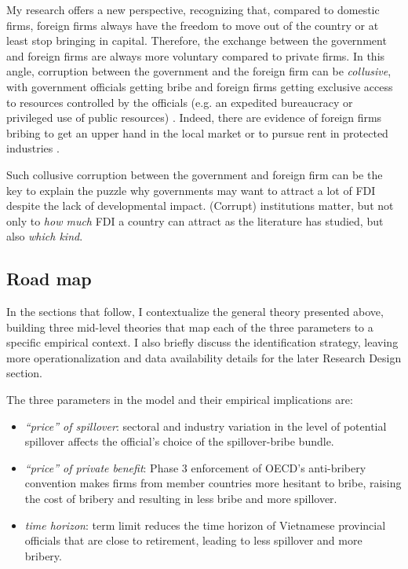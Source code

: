 My research offers a new perspective, recognizing that, compared to domestic firms, foreign firms always have the freedom to move out of the country or at least stop bringing in capital. Therefore, the exchange between the government and foreign firms are always more voluntary compared to private firms. In this angle, corruption between the government and the foreign firm can be \textit{collusive}, with government officials getting bribe and foreign firms getting exclusive access to resources controlled by the officials (e.g. an expedited bureaucracy or privileged use of public resources) \citep{Hellman2002}. Indeed, there are evidence of foreign firms bribing to get an upper hand in the local market \citep{Barstow2012} or to pursue rent in protected industries \citep{Malesky2015}. 

Such collusive corruption between the government and foreign firm can be the key to explain the puzzle why governments may want to attract a lot of FDI despite the lack of developmental impact. (Corrupt) institutions matter, but not only to \textit{how much} FDI a country can attract as the literature has studied, but also \textit{which kind}.


\subsection{Road map}

In the sections that follow, I contextualize the general theory presented above, building three mid-level theories that map each of the three parameters to a specific empirical context. I also briefly discuss the identification strategy, leaving more operationalization and data availability details for the later Research Design section.

The three parameters in the model and their empirical implications are:

\begin{itemize}
\item \textit{``price'' of spillover}: sectoral and industry variation in the level of potential spillover affects the official's choice of the spillover-bribe bundle.

\item \textit{``price'' of private benefit}: Phase 3 enforcement of OECD's anti-bribery convention makes firms from member countries more hesitant to bribe, raising the cost of bribery and resulting in less bribe and more spillover.

\item \textit{time horizon}: term limit reduces the time horizon of Vietnamese provincial officials that are close to retirement, leading to less spillover and more bribery.
\end{itemize}